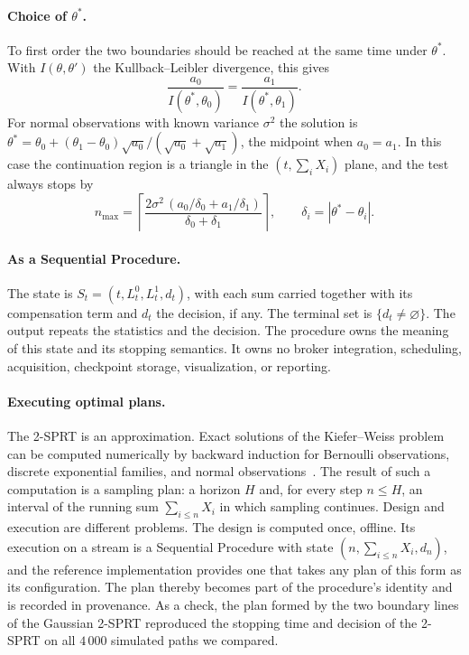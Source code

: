 \documentclass[11pt,a4paper]{article}
\theoremstyle{definition}
\theoremstyle{remark}
\begin{document}
\paragraph{Choice of $\theta^*$.}
To first order the two boundaries should be reached at the same time
under $\theta^*$. With $I(\theta,\theta')$ the Kullback--Leibler
divergence, this gives
\begin{equation}
\frac{a_0}{I(\theta^*,\theta_0)}=\frac{a_1}{I(\theta^*,\theta_1)} .
\label{eq:theta-star}
\end{equation}
For normal observations with known variance $\sigma^2$ the solution is
$\theta^*=\theta_0+(\theta_1-\theta_0)\sqrt{a_0}/(\sqrt{a_0}+\sqrt{a_1})$,
the midpoint when $a_0=a_1$. In this case the continuation region is a
triangle in the $(t,\sum_i X_i)$ plane, and the test always stops by
\begin{equation}
n_{\max}=\left\lceil
\frac{2\sigma^2\,(a_0/\delta_0+a_1/\delta_1)}{\delta_0+\delta_1}
\right\rceil,
\qquad \delta_i=|\theta^*-\theta_i| .
\label{eq:nmax}
\end{equation}

\paragraph{As a Sequential Procedure.}
The state is $S_t=(t,L^0_t,L^1_t,d_t)$, with each sum carried together
with its compensation term and $d_t$ the decision, if any. The terminal
set is $\{d_t\neq\varnothing\}$. The output repeats the statistics and
the decision. The procedure owns the meaning of this state and its
stopping semantics. It owns no broker integration, scheduling,
acquisition, checkpoint storage, visualization, or reporting.

\paragraph{Executing optimal plans.}
The 2-SPRT is an approximation. Exact solutions of the Kiefer--Weiss
problem can be computed numerically by backward induction for Bernoulli
observations, discrete exponential families, and normal
observations~\cite{novikov2022a,novikov2022b,novikov2023}. The result of
such a computation is a sampling plan: a horizon $H$ and, for every step
$n\le H$, an interval of the running sum $\sum_{i\le n}X_i$ in which
sampling continues. Design and execution are different problems. The
design is computed once, offline. Its execution on a stream is a
Sequential Procedure with state $(n,\sum_{i\le n}X_i,d_n)$, and the
reference implementation provides one that takes any plan of this form
as its configuration. The plan thereby becomes part of the procedure's
identity and is recorded in provenance. As a check, the plan formed by
the two boundary lines of the Gaussian 2-SPRT reproduced the stopping
time and decision of the 2-SPRT on all $4\,000$ simulated paths we
compared.
\end{document}
